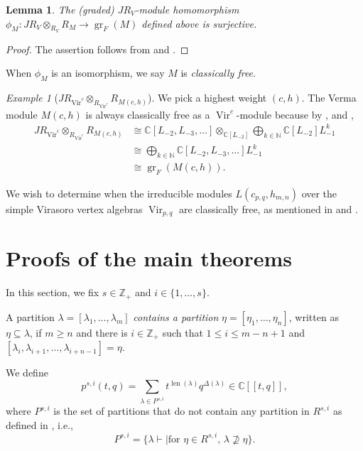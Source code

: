\documentclass[a4paper, 12pt, reqno]{amsart}
\newtheorem{lemma}[theorem]{Lemma}
\theoremstyle{remark}
\newtheorem{example}[theorem]{Example}
\DeclareMathOperator{\Vir}{Vir}
\DeclareMathOperator{\len}{len}
\DeclareMathOperator{\gr}{gr}
\begin{document}
\begin{lemma}
  \label{lmm:7}
  The (graded) $JR_V$-module homomorphism $\phi_M: JR_V \otimes_{R_V} R_M \to \gr_F(M)$ defined above is surjective.
\end{lemma}

\begin{proof}
  The assertion follows from  and .
\end{proof}

When $\phi_M$ is an isomorphism, we say $M$ is \emph{classically free}.

\begin{example}[$JR_{\Vir^c} \otimes_{R_{\Vir^c}} R_{M(c, h)}$]
  \label{exa:14}
  We pick a highest weight $(c, h)$.
  The Verma module $M(c, h)$ is always classically free as a $\Vir^c$-module because by ,  and ,
  \begin{align*}
    JR_{\Vir^c} \otimes_{R_{\Vir^c}} R_{M(c, h)} &\cong \mathbb{C}[L_{-2}, L_{-3}, \dots] \otimes_{\mathbb{C}[L_{-2}]} \bigoplus_{k \in \mathbb{N}}\mathbb{C}[L_{-2}]L_{-1}^k \\
                                                 &\cong \bigoplus_{k \in \mathbb{N}}\mathbb{C}[L_{-2}, L_{-3}, \dots]L_{-1}^k \\
                                                 &\cong \gr_F(M(c, h)).
  \end{align*}
\end{example}

We wish to determine when the irreducible modules $L(c_{p, q}, h_{m, n})$ over the simple Virasoro vertex algebras $\Vir_{p, q}$ are classically free, as mentioned in  and .

\section{Proofs of the main theorems}
\label{sec:proofs-main-theorems}

In this section, we fix $s \in \mathbb{Z}_+$ and $i \in \{1, \dots, s\}$.

A partition $\lambda = [\lambda_1, \dots, \lambda_m]$ \emph{contains a partition} $\eta = [\eta_1, \dots, \eta_n]$, written as $\eta \subseteq \lambda$, if $m \ge n$ and there is $i \in \mathbb{Z}_+$ such that $1 \le i \le m - n + 1$ and $[\lambda_i, \lambda_{i + 1}, \dots, \lambda_{i + n - 1}] = \eta$.

We define
\begin{equation*}
  p^{s, i}(t, q) = \sum_{\lambda \in P^{s, i}}t^{\len(\lambda)}q^{\Delta(\lambda)} \in \mathbb{C}[[t, q]],
\end{equation*}
where $P^{s, i}$ is the set of partitions that do not contain any partition in $R^{s, i}$ as defined in , i.e.,
\begin{equation*}
  P^{s, i} = \{\lambda \vdash \mid \text{for $\eta \in R^{s, i}$, $\lambda \nsupseteq \eta$}\}.
\end{equation*}
\end{document}
